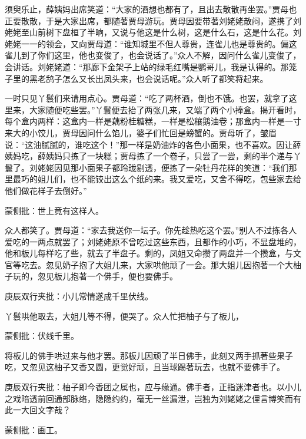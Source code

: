 \begin{parag}
    须臾乐止，薛姨妈出席笑道：“大家的酒想也都有了，且出去散散再坐罢。”贾母也正要散散，于是大家出席，都随著贾母游玩。贾母因要带著刘姥姥散闷，遂携了刘姥姥至山前树下盘桓了半晌，又说与他这是什么树，这是什么石，这是什么花。刘姥姥一一的领会，又向贾母道：“谁知城里不但人尊贵，连雀儿也是尊贵的。偏这雀儿到了你们这里，他也变俊了，也会说话了。”众人不解，因问什么雀儿变俊了，会讲话。刘姥姥道：“那廊下金架子上站的绿毛红嘴是鹦哥儿，我是认得的。那笼子里的黑老鸹子怎么又长出凤头来，也会说话呢。”众人听了都笑将起来。
\end{parag}


\begin{parag}
    一时只见丫鬟们来请用点心。贾母道：“吃了两杯酒，倒也不饿。也罢，就拿了这里来，大家随便吃些罢。”丫鬟便去抬了两张几来，又端了两个小捧盒。揭开看时，每个盒内两样：这盒内一样是藕粉桂糖糕，一样是松穰鹅油卷；那盒内一样是一寸来大的小饺儿，贾母因问什么馅儿，婆子们忙回是螃蟹的。贾母听了，皱眉说：“这油腻腻的，谁吃这个！”那一样是奶油炸的各色小面果，也不喜欢。因让薛姨妈吃，薛姨妈只拣了一块糕；贾母拣了一个卷子，只尝了一尝，剩的半个递与丫鬟了。刘姥姥因见那小面果子都玲珑剔透，便拣了一朵牡丹花样的笑道：“我们那里最巧的姐儿们，也不能铰出这么个纸的来。我又爱吃，又舍不得吃，包些家去给他们做花样子去倒好。”\begin{note}蒙侧批：世上竟有这样人。\end{note}众人都笑了。贾母道：“家去我送你一坛子。你先趁热吃这个罢。”别人不过拣各人爱吃的一两点就罢了；刘姥姥原不曾吃过这些东西，且都作的小巧，不显盘堆的，他和板儿每样吃了些，就去了半盘子。剩的，凤姐又命攒了两盘并一个攒盒，与文官等吃去。忽见奶子抱了大姐儿来，大家哄他顽了一会。那大姐儿因抱著一个大柚子玩的，忽见板儿抱著一个佛手，便也要佛手。\begin{note}庚辰双行夹批：小儿常情遂成千里伏线。\end{note}丫鬟哄他取去，大姐儿等不得，便哭了。众人忙把柚子与了板儿，\begin{note}蒙侧批：伏线千里。\end{note}将板儿的佛手哄过来与他才罢。那板儿因顽了半日佛手，此刻又两手抓著些果子吃，又忽见这柚子又香又圆，更觉好顽，且当球踢著玩去，也就不要佛手了。\begin{note}庚辰双行夹批：柚子即今香团之属也，应与缘通。佛手者，正指迷津者也。以小儿之戏暗透前回通部脉络，隐隐约约，毫无一丝漏泄，岂独为刘姥姥之俚言博笑而有此一大回文字哉？\end{note}\begin{note}蒙侧批：画工。\end{note}
\end{parag}


